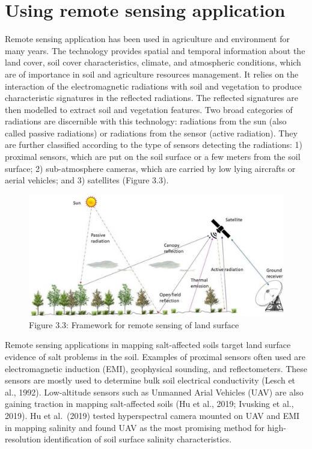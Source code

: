 \documentclass[
  10pt,
  b5paper,
]{book}
\begin{document}
\hypertarget{using-remote-sensing-application}{%
\section{Using remote sensing application}\label{using-remote-sensing-application}}

Remote sensing application has been used in agriculture and environment for many years. The technology provides spatial and temporal information about the land cover, soil cover characteristics, climate, and atmospheric conditions, which are of importance in soil and agriculture resources management. It relies on the interaction of the electromagnetic radiations with soil and vegetation to produce characteristic signatures in the reflected radiations. The reflected signatures are then modelled to extract soil and vegetation features. Two broad categories of radiations are discernible with this technology: radiations from the sun (also called passive radiations) or radiations from the sensor (active radiation). They are further classified according to the type of sensors detecting the radiations: 1) proximal sensors, which are put on the soil surface or a few meters from the soil surface; 2) sub-atmosphere cameras, which are carried by low lying aircrafts or aerial vehicles; and 3) satellites (Figure 3.3).

\begin{figure}
\centering
\includegraphics{figures/images/Figure3.3.jpg}
\caption{Figure 3.3: Framework for remote sensing of land surface}
\end{figure}

Remote sensing applications in mapping salt-affected soils target land surface evidence of salt problems in the soil. Examples of proximal sensors often used are electromagnetic induction (EMI), geophysical sounding, and reflectometers. These sensors are mostly used to determine bulk soil electrical conductivity (Lesch et al., 1992). Low-altitude sensors such as Unmanned Arial Vehicles (UAV) are also gaining traction in mapping salt-affected soils (Hu et al., 2019; Ivusking et al., 2019). Hu et al.~(2019) tested hyperspectral camera mounted on UAV and EMI in mapping salinity and found UAV as the most promising method for high-resolution identification of soil surface salinity characteristics.
\end{document}
